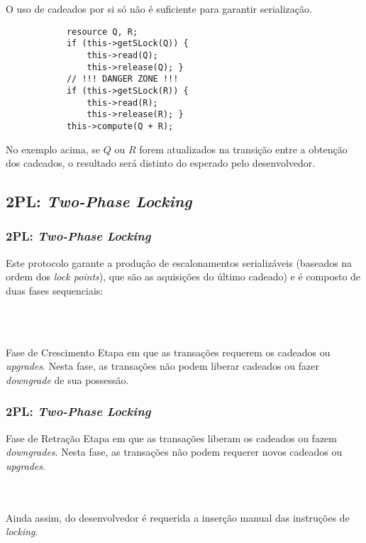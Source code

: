 \documentclass{beamer}
\begin{document}

\begin{frame}[fragile]
    O uso de cadeados por si só não é suficiente para garantir serialização.

    \begin{example}
        \begin{verbatim}
            resource Q, R;
            if (this->getSLock(Q)) {
                this->read(Q);
                this->release(Q); }
            // !!! DANGER ZONE !!!
            if (this->getSLock(R)) {
                this->read(R);
                this->release(R); }
            this->compute(Q + R);
        \end{verbatim}
    \end{example}

    No exemplo acima, se $Q$ ou $R$ forem atualizados na transição entre a obtenção dos cadeados, o resultado será distinto do esperado pelo desenvolvedor.

\end{frame}


\subsection{2PL: \emph{Two-Phase Locking}}
\begin{frame}
    \frametitle{2PL: \emph{Two-Phase Locking}}

    Este protocolo garante a produção de escalonamentos serializáveis (baseados na ordem dos \emph{lock points}), que são as aquisições do último cadeado) e é composto de duas fases sequenciais:

    \\~\\
    \begin{block}{Fase de Crescimento}
        Etapa em que as transações requerem os cadeados ou \emph{upgrades}. Nesta fase, as transações não podem liberar cadeados ou fazer \emph{downgrade} de sua possessão.
    \end{block}
\end{frame}

\begin{frame}
    \frametitle{2PL: \emph{Two-Phase Locking}}
    \begin{block}{Fase de Retração}
        Etapa em que as transações liberam os cadeados ou fazem \emph{downgrades}. Nesta fase, as transações não podem requerer novos cadeados ou \emph{upgrades}.
    \end{block}

    \\~\\
    Ainda assim, do desenvolvedor é requerida a inserção manual das instruções de \emph{locking}.
\end{frame}
\end{document}
